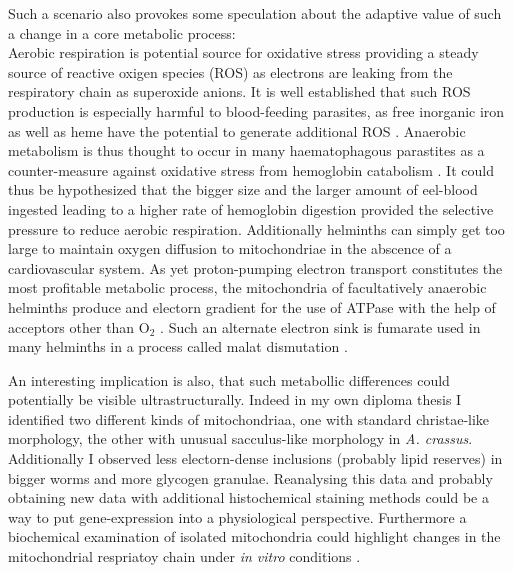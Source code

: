 Such a scenario also provokes some speculation about the adaptive
value of such a change in a core metabolic process:\\
Aerobic respiration is potential source for oxidative stress providing
a steady source of reactive oxigen species (ROS) as electrons are
leaking from the respiratory chain as superoxide anions. It is well
established that such ROS production is especially harmful to
blood-feeding parasites, as free inorganic iron as well as heme have
the potential to generate additional ROS
\cite{pmid21087517}. Anaerobic metabolism is thus thought to occur in
many haematophagous parastites as a counter-measure against oxidative
stress from hemoglobin catabolism \cite{pmid12163151}. It could thus
be hypothesized that the bigger size and the larger amount of
eel-blood ingested leading to a higher rate of hemoglobin digestion
provided the selective pressure to reduce aerobic
respiration. Additionally helminths can simply get too large to
maintain oxygen diffusion to mitochondriae in the abscence of a
cardiovascular system. As yet proton-pumping electron transport
constitutes the most profitable metabolic process, the mitochondria of
facultatively anaerobic helminths produce and electorn gradient for
the use of ATPase with the help of acceptors other than O$_2$
\cite{pmid12417132}. Such an alternate electron sink is fumarate used
in many helminths in a process called malat dismutation
\cite{pmid15275412}.

An interesting implication is also, that such metabollic differences
could potentially be visible ultrastructurally. Indeed in my own
diploma thesis \cite{heitlinger_vergleichende_2008} I identified two
different kinds of mitochondriaa, one with standard christae-like
morphology, the other with unusual sacculus-like morphology in
\textit{A. crassus}. Additionally I observed less electorn-dense
inclusions (probably lipid reserves) in bigger worms and more glycogen
granulae. Reanalysing this data and probably obtaining new data with
additional histochemical staining methods could be a way to put
gene-expression into a physiological perspective. Furthermore a
biochemical examination of isolated mitochondria could highlight
changes in the mitochondrial respriatoy chain under \textit{in vitro}
conditions \cite{pmid18314717}.

